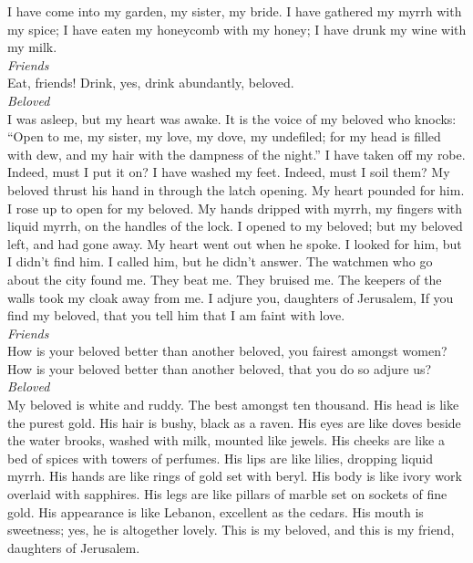  I have come into my garden, my sister, my bride. I have
gathered my myrrh with my spice; I have eaten my honeycomb with my
honey; I have drunk my wine with my milk.\\
\emph{Friends}\\
Eat, friends! Drink, yes, drink abundantly, beloved.\\
\emph{Beloved}\\
 I was asleep, but my heart was awake. It is the voice of
my beloved who knocks: ``Open to me, my sister, my love, my dove, my
undefiled; for my head is filled with dew, and my hair with the dampness
of the night.''  I have taken off my robe. Indeed, must I
put it on? I have washed my feet. Indeed, must I soil them?
 My beloved thrust his hand in through the latch opening.
My heart pounded for him.  I rose up to open for my
beloved. My hands dripped with myrrh, my fingers with liquid myrrh, on
the handles of the lock.  I opened to my beloved; but my
beloved left, and had gone away. My heart went out when he spoke. I
looked for him, but I didn't find him. I called him, but he didn't
answer.  The watchmen who go about the city found me. They
beat me. They bruised me. The keepers of the walls took my cloak away
from me.  I adjure you, daughters of Jerusalem, If you
find my beloved, that you tell him that I am faint with love.\\
\emph{Friends}\\
 How is your beloved better than another beloved, you
fairest amongst women? How is your beloved better than another beloved,
that you do so adjure us?\\
\emph{Beloved}\\
 My beloved is white and ruddy. The best amongst ten
thousand.  His head is like the purest gold. His hair is
bushy, black as a raven.  His eyes are like doves beside
the water brooks, washed with milk, mounted like jewels. 
His cheeks are like a bed of spices with towers of perfumes. His lips
are like lilies, dropping liquid myrrh.  His hands are
like rings of gold set with beryl. His body is like ivory work overlaid
with sapphires.  His legs are like pillars of marble set
on sockets of fine gold. His appearance is like Lebanon, excellent as
the cedars.  His mouth is sweetness; yes, he is
altogether lovely. This is my beloved, and this is my friend, daughters
of Jerusalem.

